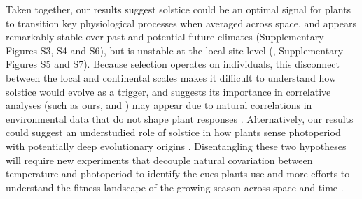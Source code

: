 \documentclass[11pt,letter]{article}
\begin{document}
Taken together, our results suggest solstice could be an optimal signal for plants to transition key physiological processes when averaged across space, and appears remarkably stable over past and potential future climates (Supplementary Figures S3, S4 and S6), but is unstable at the local site-level (, Supplementary Figures S5 and S7). Because selection operates on individuals, this disconnect between the local and continental scales makes it difficult to understand how solstice would evolve as a trigger, and suggests its importance in correlative analyses (such as ours, \citealp{Zohner2023} and \citealp{Journe2024}) may appear due to natural correlations in environmental data that do not shape plant responses \citep[e.g.][]{Gao2024}. Alternatively, our results could suggest an understudied role of solstice in how plants sense photoperiod with potentially deep evolutionary origins \citep{morales2024phylogenetic}. Disentangling these two hypotheses will require new experiments that decouple natural covariation between temperature and photoperiod \citep{Buonaiuto2023, Elmendorf2020} to identify the cues plants use and more efforts to understand the fitness landscape of the growing season across space and time \citep{Park2022}.









\end{document}
